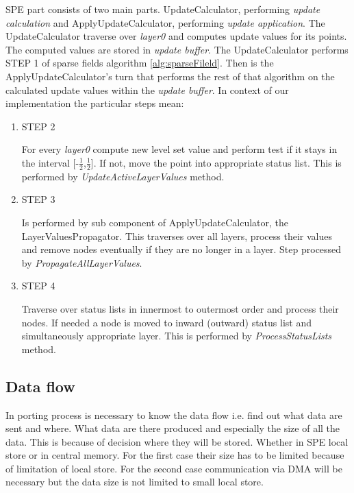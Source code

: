 SPE part consists of two main parts.
UpdateCalculator, performing \emph{update calculation} and ApplyUpdateCalculator, performing \emph{update application}.
The UpdateCalculator traverse over \emph{layer0} and computes update values for its points.
The computed values are stored in \emph{update buffer}.
The UpdateCalculator performs STEP 1 of sparse fields algorithm \ref{alg:sparseFileld}.
Then is the ApplyUpdateCalculator's turn that performs the rest of that algorithm on the calculated update values within the \emph{update buffer}.
In context of our implementation the particular steps mean:
\begin{enumerate}
\item STEP 2
\par
For every \emph{layer0} compute new level set value and perform test if it stays in the interval [-$\frac{1}{2}$,$\frac{1}{2}$].
If not, move the point into appropriate status list.
This is performed by \emph{UpdateActiveLayerValues} method.

\item STEP 3
\par
Is performed by sub component of ApplyUpdateCalculator, the LayerValuesPropagator.
This traverses over all layers, process their values and remove nodes eventually if they are no longer in a layer.
Step processed by \emph{PropagateAllLayerValues}.

\item STEP 4
\par
Traverse over status lists in innermost to outermost order and process their nodes.
If needed a node is moved to inward (outward) status list and simultaneously appropriate layer.
This is performed by \emph{ProcessStatusLists} method.
\end{enumerate}

\subsection{Data flow}

\par
In porting process is necessary to know the data flow i.e. find out what data are sent and where.
What data are there produced and especially the size of all the data.
This is because of decision where they will be stored.
Whether in SPE local store or in central memory.
For the first case their size has to be limited because of limitation of local store.
For the second case communication via DMA will be necessary but the data size is not limited to small local store.


